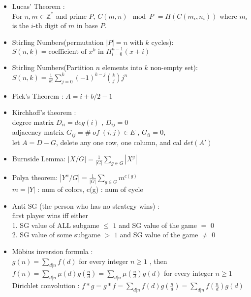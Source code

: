 \begin{itemize}
\item Lucas’ Theorem :\\
  For $n, m \in \mathbb{Z}^{*}$ and prime $P$,
  $C(m,n) \mod P$
	$= \Pi ( C(m_i,n_i) )$
	where $m_i$ is the $i$-th digit of $m$ in base $P$.
\item Stirling Numbers(permutation $|P|=n$ with $k$ cycles): \\
  $S(n,k) = \text{coefficient of }x^k \text{ in } \Pi_{i=0}^{n-1} (x+i)$
\item Stirling Numbers(Partition $n$ elements into $k$ non-empty set): \\
  $S(n,k) = \frac{1}{k!} \sum\limits_{j=0}^k (-1)^{k-j} {k \choose j} j^n$
\item Pick’s Theorem : $A = i + b/2 - 1$
\item Kirchhoff's theorem :\\
  degree matrix $D_{ii} = deg(i)$ , $D_{ij} = 0$\\
  adjacency matrix $G_{ij} = \#\;of\;(i,j) \in E$ , $G_{ii} = 0$,\\
  let $A = D - G$, delete any one row, one column, and cal $det(A')$
\item Burnside Lemma:
  $|X/G|=\frac{1}{|G|}\sum\limits_{g \in G} {|X^g|}$
\item Polya theorem:
  $|Y^x/G|=\frac{1}{|G|}\sum\limits_{g \in G} {m^{c(g)}}$\\
  $m = |Y|$ : num of colors, c(g) : num of cycle
\item Anti SG (the person who has no strategy wins) :\\
  first player wins iff either\\
  1. SG value of ALL subgame $\le$ $1$ and SG value of the game $=$ $0$\\
  2. SG value of some subgame $>$ $1$ and SG value of the game $\neq$ $0$
\item Möbius inversion formula :\\
  $g(n) = \sum\limits_{d|n}f(d)$ for every integer $n\ge 1$ , then\\
  $f(n) = \sum\limits_{d|n}\mu(d)g(\frac{n}{d}) = \sum\limits_{d|n}\mu(\frac{n}{d})g(d)$ for every integer $n\ge 1$\\
  Dirichlet convolution : $f*g=g*f=\sum\limits_{d|n}f(d)g(\frac{n}{d})=\sum\limits_{d|n}f(\frac{n}{d})g(d)$\\

\end{itemize}
